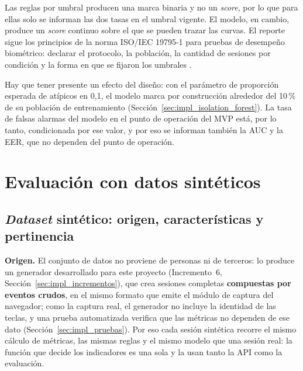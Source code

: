 Las reglas por umbral producen una marca binaria y no un \textit{score}, por lo que para ellas solo se informan las dos tasas en el umbral vigente. El modelo, en cambio, produce un \textit{score} continuo sobre el que se pueden trazar las curvas. El reporte sigue los principios de la norma ISO/IEC 19795-1 para pruebas de desempeño biométrico: declarar el protocolo, la población, la cantidad de sesiones por condición y la forma en que se fijaron los umbrales \parencite{ISOIEC2021_19795}.

Hay que tener presente un efecto del diseño: con el parámetro de proporción esperada de atípicos en 0{,}1, el modelo marca por construcción alrededor del 10\,\% de su población de entrenamiento (Sección~\ref{sec:impl_isolation_forest}). La tasa de falsas alarmas del modelo en el punto de operación del MVP está, por lo tanto, condicionada por ese valor, y por eso se informan también la AUC y la EER, que no dependen del punto de operación.

\section{Evaluación con datos sintéticos}
\label{sec:eval_sintetica}

\subsection{\textit{Dataset} sintético: origen, características y pertinencia}
\label{sec:eval_dataset}

\textbf{Origen.} El conjunto de datos no proviene de personas ni de terceros: lo produce un generador desarrollado para este proyecto (Incremento~6, Sección~\ref{sec:impl_incrementos}), que crea sesiones completas \textbf{compuestas por eventos crudos}, en el mismo formato que emite el módulo de captura del navegador; como la captura real, el generador no incluye la identidad de las teclas, y una prueba automatizada verifica que las métricas no dependen de ese dato (Sección~\ref{sec:impl_pruebas}). Por eso cada sesión sintética recorre el mismo cálculo de métricas, las mismas reglas y el mismo modelo que una sesión real: la función que decide los indicadores es una sola y la usan tanto la API como la evaluación.

